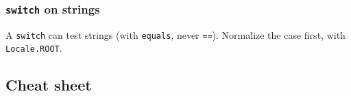 \documentclass[aspectratio=169,10pt,compress]{beamer}
\begin{document}
\begin{frame}[t,fragile] \frametitle{\texttt{switch} on strings}

  \vspace{0.3em}
  \small A \texttt{switch} can test strings (with \texttt{equals}, never \texttt{==}). Normalize the case first, with \texttt{Locale.ROOT}.
\end{frame}


\subsection[Cheat sheet]{Cheat sheet}
\end{document}
